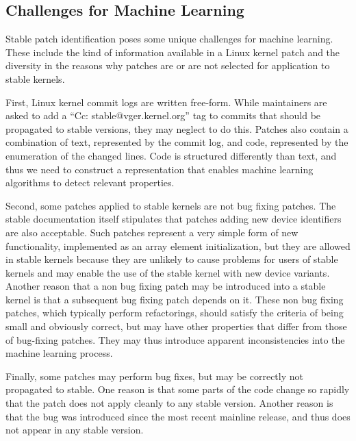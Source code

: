 \subsection{Challenges for Machine Learning}
\label{sec:challenges}

Stable patch identification poses some unique challenges for machine learning.
These include the kind of information available in a Linux kernel patch and the
diversity in the reasons why patches are or are not selected for application to stable
kernels.

First, Linux kernel commit logs are written free-form. While maintainers
are asked to add a ``Cc: stable@vger.kernel.org'' tag to commits that
should be propagated to stable versions, they may neglect to do this.  
  Patches also contain a combination of text, represented by the
commit log, and code, represented by the enumeration of the changed
lines. Code is structured differently than text, and thus we need to
construct a representation that enables machine learning algorithms to
detect relevant properties.

Second, some patches applied to stable kernels are not bug fixing
patches. The stable documentation itself stipulates that patches adding new
device identifiers are also acceptable. Such patches represent a very simple form
of new functionality, implemented as an array element initialization, but they are
allowed in stable kernels because they are unlikely to cause problems for users of
stable kernels and may enable the use of the stable kernel with new device variants.
Another reason that a non bug
fixing patch may be introduced into a stable kernel is that a subsequent bug
fixing patch depends on it. 
These non bug fixing patches, which typically perform
refactorings, should satisfy the criteria of being small and obviously correct, but
may have other properties that differ from those of bug-fixing patches. They may
thus introduce apparent inconsistencies into the machine learning process.

Finally, some patches may perform bug fixes, but may be correctly not propagated to
stable. One reason is that some parts of the code change so rapidly that the patch
does not apply cleanly to any stable version. Another reason is that the bug was
introduced since the most recent mainline release, and thus does not appear in any
stable version.

